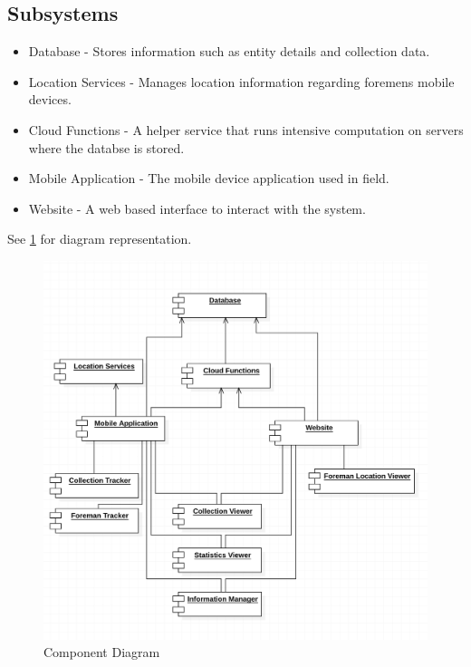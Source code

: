 \documentclass[11pt]{article}
\begin{document}
\subsection{Subsystems}
\begin{itemize}
\item Database - Stores information such as entity details and collection data.
\item Location Services - Manages location information regarding foremens mobile devices.
\item Cloud Functions - A helper service that runs intensive computation on servers where the databse is stored.
\item Mobile Application - The mobile device application used in field.
\item Website - A web based interface to interact with the system.
\end{itemize}
See \ref{ComponentDiagram} for diagram representation.
\begin{figure}
 \centering
 \includegraphics[width=12cm, keepaspectratio]{ComponentDiagram.png}
 \caption{Component Diagram}
 \label{ComponentDiagram}
\end{figure}
\end{document}

